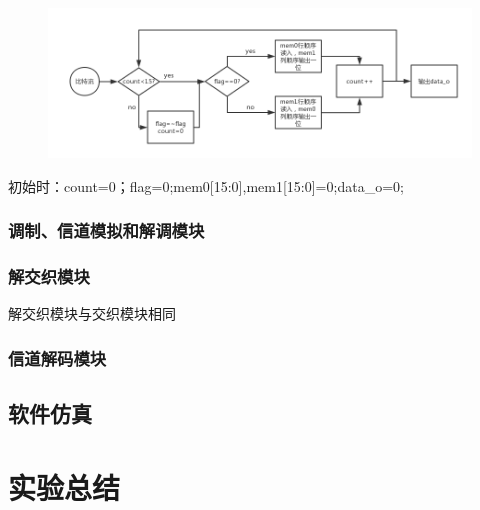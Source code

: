 \documentclass[UTF8]{ctexart}
\begin{document}
\begin{figure}[H]
    \centering
    \includegraphics[width=.8\textwidth]{images//inter_pic.png}
\end{figure}

初始时：count=0；flag=0;mem0[15:0],mem1[15:0]=0;data\_o=0;

\subsubsection{调制、信道模拟和解调模块}


\subsubsection{解交织模块}

解交织模块与交织模块相同

\subsubsection{信道解码模块}


\subsection{软件仿真}


\section{实验总结}

\end{document}
